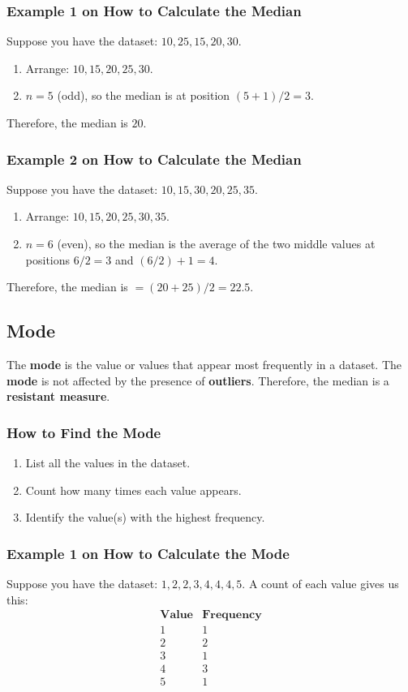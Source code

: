 \subsubsection*{Example 1 on How to Calculate the Median}
Suppose you have the dataset: \( 10, 25, 15, 20, 30 \).
\begin{enumerate}
    \item Arrange: \(10, 15, 20, 25, 30\).
    \item \(n = 5\) (odd), so the median is at position \((5+1)/2 = 3\).
\end{enumerate}

Therefore, the median is \( 20 \).

\subsubsection*{Example 2 on How to Calculate the Median}
Suppose you have the dataset: \( 10, 15, 30, 20, 25, 35 \).
\begin{enumerate}
    \item Arrange: \(10, 15, 20, 25, 30, 35\).
    \item \(n = 6\) (even), so the median is the average of the two middle values at positions \(6/2 = 3\) and \((6/2) + 1 = 4\).
\end{enumerate}

Therefore, the median is \( = (20 + 25)/2 = 22.5 \).

\subsection{Mode}
The \textbf{mode} is the value or values that appear most frequently in a dataset. The \textbf{mode} is not affected by the presence of \textbf{outliers}. Therefore, the median is a \textbf{resistant measure}.

\subsubsection*{How to Find the Mode}
\begin{enumerate}
    \item List all the values in the dataset.
    \item Count how many times each value appears.
    \item Identify the value(s) with the highest frequency.
\end{enumerate}

\subsubsection*{Example 1 on How to Calculate the Mode}
Suppose you have the dataset: \(1, 2, 2, 3, 4, 4, 4, 5\). A count of each value gives us this: 
\[
\begin{array}{c|l}
\textbf{Value} & \textbf{Frequency} \\
\hline
1 & 1 \\
2 & 2 \\
3 & 1 \\
4 & 3 \\
5 & 1 \\
\end{array}
\]

